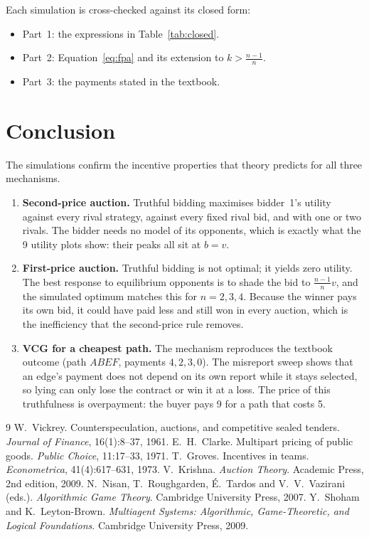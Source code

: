 \documentclass[11pt,a4paper]{article}
\begin{document}
Each simulation is cross-checked against its closed form:
\begin{itemize}[itemsep=0.1em]
  \item Part~1: the expressions in Table~\ref{tab:closed}.
  \item Part~2: Equation~\eqref{eq:fpa} and its extension to $k>\frac{n-1}{n}$.
  \item Part~3: the payments stated in the textbook.
\end{itemize}

\section{Conclusion}\label{sec:conc}
The simulations confirm the incentive properties that theory predicts for all three mechanisms.
\begin{enumerate}[itemsep=0.2em]
  \item \textbf{Second-price auction.} Truthful bidding maximises bidder~1's utility against every rival strategy, against every fixed rival bid, and with one or two rivals. The bidder needs no model of its opponents, which is exactly what the 9 utility plots show: their peaks all sit at $b=v$.
  \item \textbf{First-price auction.} Truthful bidding is not optimal; it yields zero utility. The best response to equilibrium opponents is to shade the bid to $\frac{n-1}{n}v$, and the simulated optimum matches this for $n=2,3,4$. Because the winner pays its own bid, it could have paid less and still won in every auction, which is the inefficiency that the second-price rule removes.
  \item \textbf{VCG for a cheapest path.} The mechanism reproduces the textbook outcome (path $ABEF$, payments $4,2,3,0$). The misreport sweep shows that an edge's payment does not depend on its own report while it stays selected, so lying can only lose the contract or win it at a loss. The price of this truthfulness is overpayment: the buyer pays 9 for a path that costs 5.
\end{enumerate}

\begin{thebibliography}{9}
 W.~Vickrey. Counterspeculation, auctions, and competitive sealed tenders. \emph{Journal of Finance}, 16(1):8--37, 1961.
 E.~H.~Clarke. Multipart pricing of public goods. \emph{Public Choice}, 11:17--33, 1971.
 T.~Groves. Incentives in teams. \emph{Econometrica}, 41(4):617--631, 1973.
 V.~Krishna. \emph{Auction Theory}. Academic Press, 2nd edition, 2009.
 N.~Nisan, T.~Roughgarden, \'E.~Tardos and V.~V.~Vazirani (eds.). \emph{Algorithmic Game Theory}. Cambridge University Press, 2007.
 Y.~Shoham and K.~Leyton-Brown. \emph{Multiagent Systems: Algorithmic, Game-Theoretic, and Logical Foundations}. Cambridge University Press, 2009.
\end{thebibliography}
\end{document}

